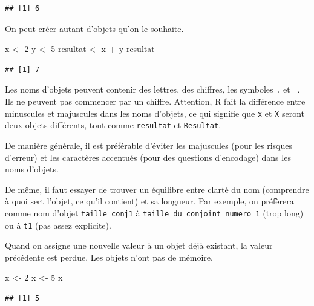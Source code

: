 \documentclass[12pt,]{book}
\makeatletter
\newenvironment{Shaded}{\begin{snugshade}}{\end{snugshade}}
\newcommand{\DecValTok}[1]{\textcolor[rgb]{0.00,0.00,0.81}{#1}}
\newcommand{\NormalTok}[1]{#1}
\newcommand{\OperatorTok}[1]{\textcolor[rgb]{0.81,0.36,0.00}{\textbf{#1}}}
\newcommand{\StringTok}[1]{\textcolor[rgb]{0.31,0.60,0.02}{#1}}
\newenvironment{kframe}{%
\medskip{}
\setlength{\fboxsep}{.8em}
\def\at@end@of@kframe{}%
\ifinner\ifhmode%
 \def\at@end@of@kframe{\end{minipage}}%
 \begin{minipage}{\columnwidth}%
\fi\fi%
\def\FrameCommand##1{\hskip\@totalleftmargin \hskip-\fboxsep
\colorbox{incolor}{##1}\hskip-\fboxsep
    \hskip-\linewidth \hskip-\@totalleftmargin \hskip\columnwidth}%
\MakeFramed {\advance\hsize-\width
  \@totalleftmargin\z@ \linewidth\hsize
  \@setminipage}}%
{\par\unskip\endMakeFramed%
\at@end@of@kframe}
\newenvironment{rmdblock}[1]
 {
 \begin{itemize}
 \renewcommand{\labelitemi}{
   \raisebox{-.7\height}[0pt][0pt]{
     {\setkeys{Gin}{width=3em,keepaspectratio}\texttt{[image: images/\#1]}}
   }
 }
 \begin{kframe}
 \setlength{\fboxsep}{1em}
 \item
 }
 {
 \end{kframe}
 \end{itemize}
 }
\newenvironment{rmdimportant}
  {\begin{rmdblock}{important}}
  {\end{rmdblock}}
\makeatother
\begin{document}
\begin{verbatim}
## [1] 6
\end{verbatim}

On peut créer autant d'objets qu'on le souhaite.

\begin{Shaded}
\begin{Highlighting}[]
\NormalTok{x <-}\StringTok{ }\DecValTok{2}
\NormalTok{y <-}\StringTok{ }\DecValTok{5}
\NormalTok{resultat <-}\StringTok{ }\NormalTok{x }\OperatorTok{+}\StringTok{ }\NormalTok{y}
\NormalTok{resultat}
\end{Highlighting}
\end{Shaded}

\begin{verbatim}
## [1] 7
\end{verbatim}

\begin{rmdimportant}
Les noms d'objets peuvent contenir des lettres, des chiffres, les symboles \texttt{.} et \texttt{\_}. Ils ne peuvent pas commencer par un chiffre. Attention, R fait la différence entre minuscules et majuscules dans les noms d'objets, ce qui signifie que \texttt{x} et \texttt{X} seront deux objets différents, tout comme \texttt{resultat} et \texttt{Resultat}.

De manière générale, il est préférable d'éviter les majuscules (pour les risques d'erreur) et les caractères accentués (pour des questions d'encodage) dans les noms d'objets.

De même, il faut essayer de trouver un équilibre entre clarté du nom (comprendre à quoi sert l'objet, ce qu'il contient) et sa longueur. Par exemple, on préfèrera comme nom d'objet \texttt{taille\_conj1} à \texttt{taille\_du\_conjoint\_numero\_1} (trop long) ou à \texttt{t1} (pas assez explicite).
\end{rmdimportant}

Quand on assigne une nouvelle valeur à un objet déjà existant, la valeur précédente est perdue. Les objets n'ont pas de mémoire.

\begin{Shaded}
\begin{Highlighting}[]
\NormalTok{x <-}\StringTok{ }\DecValTok{2}
\NormalTok{x <-}\StringTok{ }\DecValTok{5}
\NormalTok{x}
\end{Highlighting}
\end{Shaded}

\begin{verbatim}
## [1] 5
\end{verbatim}
\end{document}
